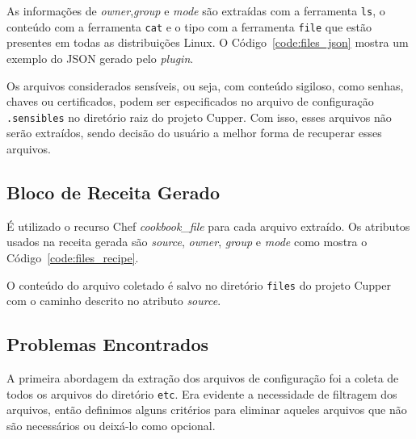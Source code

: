 As informações de \textit{owner},\textit{group} e \textit{mode} são extraídas com a ferramenta \texttt{ls},
o conteúdo com a ferramenta \texttt{cat} e o tipo com a ferramenta \texttt{file}
que estão presentes em todas as distribuições Linux.
O Código~\ref{code:files_json} mostra um exemplo do JSON gerado pelo \textit{plugin}.

\noindent\begin{minipage}{\textwidth}
  \lstset{style=shell}
  
\end{minipage}\hfill

Os arquivos considerados sensíveis, ou seja, com conteúdo sigiloso, como
senhas, chaves ou certificados, podem ser especificados no arquivo de
configuração \texttt{.sensibles} no diretório raiz do projeto Cupper. Com isso,
esses arquivos não serão extraídos, sendo decisão do usuário a melhor forma
de recuperar esses arquivos.

\subsection{Bloco de Receita Gerado}

É utilizado o recurso Chef \textit{cookbook\_file} para cada arquivo extraído.
Os atributos usados na receita gerada são \textit{source}, \textit{owner},
\textit{group} e \textit{mode} como mostra o Código~\ref{code:files_recipe}.

\noindent\begin{minipage}{\textwidth}
  \lstset{style=shell}
  
\end{minipage}\hfill

O conteúdo do arquivo coletado é salvo no diretório \texttt{files} do projeto Cupper
com o caminho descrito no atributo \textit{source}.

\subsection{Problemas Encontrados}

A primeira abordagem da extração dos arquivos de configuração foi a coleta de todos
os arquivos do diretório \texttt{etc}. Era evidente a necessidade de filtragem dos
arquivos, então definimos alguns critérios para eliminar aqueles arquivos que não são
necessários ou deixá-lo como opcional.

